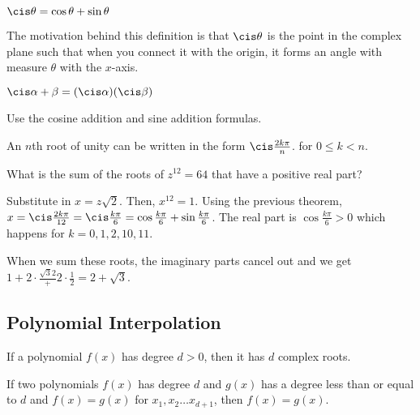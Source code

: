 \documentclass[mast]{lucky}
\begin{document}
\begin{defi}[Cis]
$\cis \theta = \cos \theta + \sin \theta$
\end{defi}
The motivation behind this definition is that $\cis \theta$ is the point in the complex plane such that when you connect it with the origin, it forms an angle with measure $\theta$ with the $x$-axis.

\begin{theo}[De Moivre's]
$\cis \alpha+\beta = (\cis \alpha)(\cis \beta)$
\end{theo}

\begin{pro}
Use the cosine addition and sine addition formulas.
\end{pro}

\begin{theo}
An $n$th root of unity can be written in the form $\cis \frac{2k\pi}{n}$. for $0\leq k<n$.
\end{theo}

\begin{exam}[AMC 12B 2017/12]
What is the sum of the roots of $z^{12}=64$ that have a positive real part?
\end{exam}

\begin{sol}
Substitute in $x=z\sqrt{2}$. Then, $x^{12}=1$. Using the previous theorem, $x=\cis \frac{2k\pi}{12}=\cis \frac{k\pi}{6}=\cos \frac{k\pi}{6}+\sin \frac{k\pi}{6}$. The real part is $\cos \frac{k\pi}{6}>0$ which happens for $k=0,1,2,10,11$. 

When we sum these roots, the imaginary parts cancel out and we get $1+2\cdot \frac{\sqrt{3}{2}}+2\cdot \frac{1}{2}=2+\sqrt{3}$.
\end{sol}



\newpage

\subsection{Polynomial Interpolation}

\begin{theo}
If a polynomial $f(x)$ has degree $d>0$, then it has $d$ complex roots.
\end{theo}

\begin{theo}
If two polynomials $f(x)$ has degree $d$ and $g(x)$ has a degree less than or equal to $d$ and $f(x)=g(x)$ for $x_{1},x_{2}\ldots x_{d+1}$, then $f(x)=g(x)$.
\end{theo}
\end{document}
